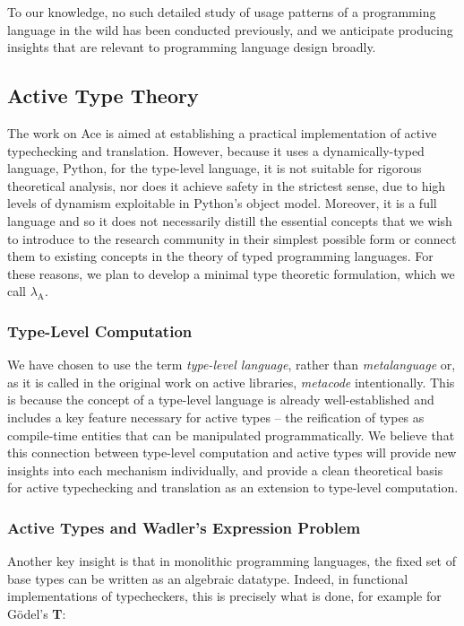 To our knowledge, no such detailed study of usage patterns of a programming language in the wild has been conducted previously, and we anticipate producing insights that are relevant to programming language design broadly.
\subsection{Active Type Theory}
The work on Ace is aimed at establishing a practical implementation of active typechecking and translation. However, because it uses a dynamically-typed language, Python, for the type-level language, it is not suitable for rigorous theoretical analysis, nor does it achieve safety in the strictest sense, due to high levels of dynamism exploitable in Python's object model. Moreover, it is a full language and so it does not necessarily distill the essential concepts that we wish to introduce to the research community in their simplest possible form or connect them to existing concepts in the theory of typed programming languages. For these reasons, we plan to develop a minimal type theoretic formulation, which we call $\lambda_{\text{A}}$.

\subsubsection{Type-Level Computation}

We have chosen to use the term \emph{type-level language}, rather than \emph{metalanguage} or, as it is called in the original work on active libraries, \emph{metacode} intentionally. This is because the concept of a type-level language is already well-established and includes a key feature necessary for active types -- the reification of types as compile-time entities that can be manipulated programmatically. We believe that this connection between type-level computation and active types will provide new insights into each mechanism individually, and provide a clean theoretical basis for active typechecking and translation as an extension to type-level computation.

\subsubsection{Active Types and Wadler's Expression Problem}
Another key insight is that in monolithic programming languages, the fixed set of base types can be written as an algebraic datatype. Indeed, in functional implementations of typecheckers, this is precisely what is done, for example for G\"{o}del's \textbf{T}:

